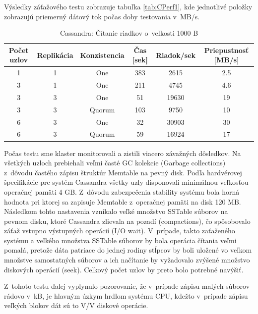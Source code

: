 \documentclass[11pt,twoside,a4paper]{book}
\begin{document}
Výsledky záťažového testu zobrazuje tabuľka \ref{tab:CPerf1}, kde jednotlivé položky zobrazujú priemerný dátový tok počas doby testovania v~MB/s.
\begin{table}[hp]
\begin{center}
\begin{tabular}{|c|c|c|c|c|c|}
\hline Počet uzlov & Replikácia & Konzistencia & Čas [sek] & Riadok/sek & Priepustnosť [MB/s]\\ 
\hline
\hline 1 & 1 & One & 383 & 2615 & 2.5\\ 
\hline 3 & 1 & One & 211 & 4745 & 4.6\\ 
\hline 3 & 3 & One & 51 & 19630 & 19\\ 
\hline 3 & 3 & Quorum & 103 & 9750 & 10\\ 
\hline 6 & 3 & One & 32 & 30903 & 30\\ 
\hline 6 & 3 & Quorum & 59 & 16924 & 17\\ 
\hline
\end{tabular} 
\end{center}
\caption{Cassandra: Čítanie riadkov o~veľkosti 1000 B}
\label{tab:CPerf3}
\end{table}
Počas testu sme klaster monitorovali a zistili viacero závažných dôsledkov. Na všetkých uzloch prebiehali veľmi časté GC kolekcie (Garbage collections) z~dôvodu častého zápisu štruktúr Memtable na pevný disk. Podľa hardvérovej špecifikácie pre systém Cassandra všetky uzly disponovali minimálnou veľkosťou operačnej pamäti 4 GB. Z~dôvodu zabezpečenia stability systému bola horná hodnota pri ktorej sa zapisuje Memtable z~operačnej pamäti na disk 120 MB. Následkom tohto nastavenia vznikalo veľké množstvo SSTable súborov na pevnom disku, ktoré Cassandra zlievala na pozadí (compactions), čo spôsobovalo záťaž vstupno výstupných operácií (I/O wait). V~prípade, takto zaťaženého systému a veľkého množstva SSTable súborov by bola operácia čítania veľmi pomalá, pretože dáta patriace do jednej rodiny stĺpcov by boli uložené vo veľkom množstve samostatných súborov a ich načítanie by vyžadovalo zvýšené množstvo diskových operácií (seek). Celkový počet uzlov by preto bolo potrebné navýšiť.

Z~tohoto testu ďalej vyplynulo pozorovanie, že v~prípade zápisu malých súborov rádovo v~kB, je hlavným úzkym hrdlom systému CPU, kdežto v~prípade zápisu veľkých blokov dát sú to V/V diskové operácie.
\end{document}

